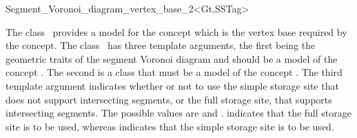 

\begin{ccRefClass}{Segment_Voronoi_diagram_vertex_base_2<Gt,SSTag>}


\ccDefinition

The class \ccRefName\ provides a model for the
 concept which is the vertex
base required by the 
concept. The class \ccRefName\ has three template arguments, the first
being the geometric traits of the segment Voronoi diagram and should be a
model of the concept . The second
is a class that must be a model of the concept
. The third template argument indicates whether
or not to use the simple storage site that does not support
intersecting segments, or the full storage site, that supports
intersecting segments. The possible values are 
and .  indicates that the
full storage site is to be used, whereas 
indicates that the simple storage site is to be used.



\ccIsModel
{}\\
\\
\\
\\

\ccCreation
{}  %


\end{ccRefClass}

